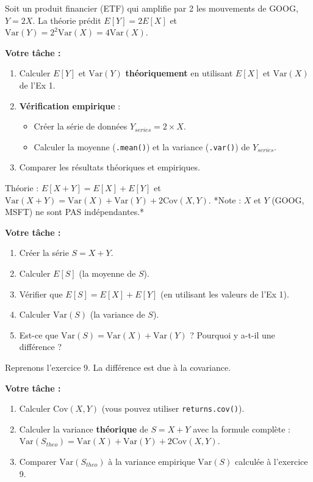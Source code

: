 \begin{exercicebox}[Exercice 8 : Stabilité par Transformation Linéaire (Y=aX+b)]
Soit un produit financier (ETF) qui amplifie par 2 les mouvements de GOOG, $Y = 2X$.
La théorie prédit $E[Y] = 2E[X]$ et $\text{Var}(Y) = 2^2 \text{Var}(X) = 4\text{Var}(X)$.

\textbf{Votre tâche :}
\begin{enumerate}
    \item Calculer $E[Y]$ et $\text{Var}(Y)$ \textbf{théoriquement} en utilisant $E[X]$ et $\text{Var}(X)$ de l'Ex 1.
    \item \textbf{Vérification empirique} :
        \begin{itemize}
            \item Créer la série de données $Y_{series} = 2 \times X$.
            \item Calculer la moyenne (\texttt{.mean()}) et la variance (\texttt{.var()}) de $Y_{series}$.
        \end{itemize}
    \item Comparer les résultats théoriques et empiriques.
\end{enumerate}
\end{exercicebox}

\begin{exercicebox}[Exercice 9 : Stabilité par Addition (Portefeuille S=X+Y)]
Théorie : $E[X+Y] = E[X] + E[Y]$ et $\text{Var}(X+Y) = \text{Var}(X) + \text{Var}(Y) + 2\text{Cov}(X,Y)$.
*Note : $X$ et $Y$ (GOOG, MSFT) ne sont PAS indépendantes.*

\textbf{Votre tâche :}
\begin{enumerate}
    \item Créer la série $S = X + Y$.
    \item Calculer $E[S]$ (la moyenne de $S$).
    \item Vérifier que $E[S] = E[X] + E[Y]$ (en utilisant les valeurs de l'Ex 1).
    \item Calculer $\text{Var}(S)$ (la variance de $S$).
    \item Est-ce que $\text{Var}(S) = \text{Var}(X) + \text{Var}(Y)$ ? Pourquoi y a-t-il une différence ?
\end{enumerate}
\end{exercicebox}

\begin{exercicebox}
Reprenons l'exercice 9. La différence est due à la covariance.

\textbf{Votre tâche :}
\begin{enumerate}
    \item Calculer $\text{Cov}(X,Y)$ (vous pouvez utiliser \texttt{returns.cov()}).
    \item Calculer la variance \textbf{théorique} de $S = X+Y$ avec la formule complète : $\text{Var}(S_{theo}) = \text{Var}(X) + \text{Var}(Y) + 2\text{Cov}(X,Y)$.
    \item Comparer $\text{Var}(S_{theo})$ à la variance empirique $\text{Var}(S)$ calculée à l'exercice 9.
\end{enumerate}
\end{exercicebox}


